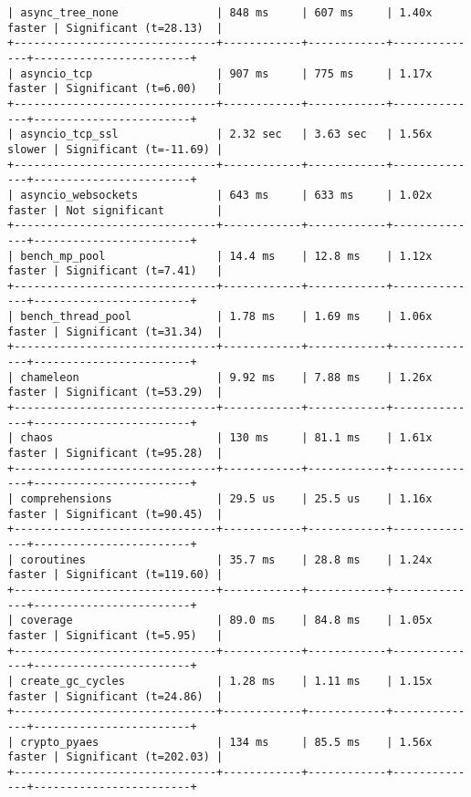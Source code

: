\begin{code}
\begin{verbatim}
| async_tree_none               | 848 ms     | 607 ms     | 1.40x faster | Significant (t=28.13)  |
+-------------------------------+------------+------------+--------------+------------------------+
| asyncio_tcp                   | 907 ms     | 775 ms     | 1.17x faster | Significant (t=6.00)   |
+-------------------------------+------------+------------+--------------+------------------------+
| asyncio_tcp_ssl               | 2.32 sec   | 3.63 sec   | 1.56x slower | Significant (t=-11.69) |
+-------------------------------+------------+------------+--------------+------------------------+
| asyncio_websockets            | 643 ms     | 633 ms     | 1.02x faster | Not significant        |
+-------------------------------+------------+------------+--------------+------------------------+
| bench_mp_pool                 | 14.4 ms    | 12.8 ms    | 1.12x faster | Significant (t=7.41)   |
+-------------------------------+------------+------------+--------------+------------------------+
| bench_thread_pool             | 1.78 ms    | 1.69 ms    | 1.06x faster | Significant (t=31.34)  |
+-------------------------------+------------+------------+--------------+------------------------+
| chameleon                     | 9.92 ms    | 7.88 ms    | 1.26x faster | Significant (t=53.29)  |
+-------------------------------+------------+------------+--------------+------------------------+
| chaos                         | 130 ms     | 81.1 ms    | 1.61x faster | Significant (t=95.28)  |
+-------------------------------+------------+------------+--------------+------------------------+
| comprehensions                | 29.5 us    | 25.5 us    | 1.16x faster | Significant (t=90.45)  |
+-------------------------------+------------+------------+--------------+------------------------+
| coroutines                    | 35.7 ms    | 28.8 ms    | 1.24x faster | Significant (t=119.60) |
+-------------------------------+------------+------------+--------------+------------------------+
| coverage                      | 89.0 ms    | 84.8 ms    | 1.05x faster | Significant (t=5.95)   |
+-------------------------------+------------+------------+--------------+------------------------+
| create_gc_cycles              | 1.28 ms    | 1.11 ms    | 1.15x faster | Significant (t=24.86)  |
+-------------------------------+------------+------------+--------------+------------------------+
| crypto_pyaes                  | 134 ms     | 85.5 ms    | 1.56x faster | Significant (t=202.03) |
+-------------------------------+------------+------------+--------------+------------------------+

\end{verbatim}
\end{code}
